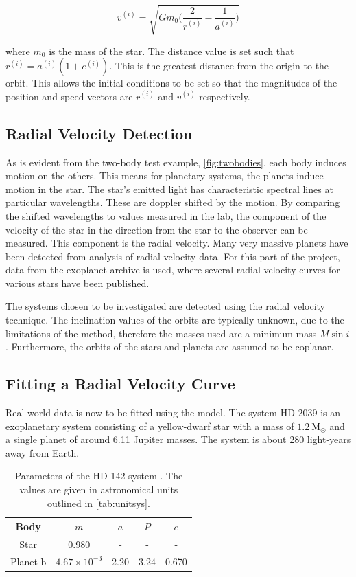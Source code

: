 \documentclass{physics_article_B}
\begin{document}
\begin{equation}
 v^{(i)} = \sqrt{Gm_0\bigg(\frac{2}{r^{(i)}} - \frac{1}{a^{(i)}}\bigg)}
 \label{eq:visviva}
\end{equation}

where $m_0$ is the mass of the star. The distance value is set such that $r^{(i)} = a^{(i)}(1+e^{(i)})$. This is the greatest distance from the origin to the orbit. This allows the initial conditions to be set so that the magnitudes of the position and speed vectors are $r^{(i)}$ and $v^{(i)}$ respectively.

\subsection{Radial Velocity Detection}
As is evident from the two-body test example, \cref{fig:twobodies}, each body induces motion on the others. This means for planetary systems, the planets induce motion in the star. The star's emitted light has characteristic spectral lines at particular wavelengths. These are doppler shifted by the motion. By comparing the shifted wavelengths to values measured in the lab, the component of the velocity of the star in the direction from the star to the observer can be measured. This component is the radial velocity. Many very massive planets have been detected from analysis of radial velocity data. For this part of the project, data from the exoplanet archive \cite{noauthor_bulk_nodate} is used, where several radial velocity curves for various stars have been published.

The systems chosen to be investigated are detected using the radial velocity technique. The inclination values of the orbits are typically unknown, due to the limitations of the method, therefore the masses used are a minimum mass $M\sin i$. Furthermore, the orbits of the stars and planets are assumed to be coplanar.

\subsection{Fitting a Radial Velocity Curve}
Real-world data is now to be fitted using the model. The system HD 2039 is an exoplanetary system consisting of a yellow-dwarf star with a mass of $1.2\ \mathrm{M_\odot}$ and a single planet of around 6.11 Jupiter masses. The system is about 280 light-years away from Earth.

\begin{table}[H]
 \centering
 \caption{Parameters of the HD 142 system \cite{noauthor_open_nodate}. The values are given in astronomical units outlined in \cref{tab:unitsys}.}

 \setlength{\tabcolsep}{0.5em}
 \renewcommand{\arraystretch}{1.5}
 \begin{tabular}{|c|c|c|c|c|}
 \hline
 Body & $m$ & $a$ & $P$ & $e$ \\
 \hline
 Star & 0.980 & - & - & - \\
 \hline
 Planet b & $4.67\times10^{-3}$ & 2.20 & 3.24 & 0.670\\
 \hline
 \end{tabular}
 \label{tab:hd142}
\end{table}
\end{document}
